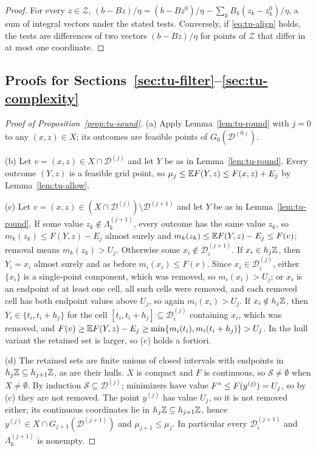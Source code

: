 \begin{proof}
For every $z\in\mathcal Z$,
$(b-Bz)/\eta=(b-Bz^0)/\eta-\sum_kB_k(z_k-z^0_k)/\eta$, a sum of integral
vectors under the stated tests. Conversely, if \eqref{eq:tu-align} holds, the
tests are differences of two vectors $(b-Bz)/\eta$ for points of
$\mathcal Z$ that differ in at most one coordinate.
\end{proof}

\subsection{Proofs for Sections~\ref{sec:tu-filter}--\ref{sec:tu-complexity}}\label{app:tu-proofs}

\begin{proof}[Proof of Proposition~\ref{prop:tu-sound}]
(a) Apply Lemma~\ref{lem:tu-round} with $j=0$ to any $(x,z)\in X$; its
outcomes are feasible points of $G_0(\mathcal D^{(0)})$.

(b) Let $v=(x,z)\in X\cap\mathcal D^{(j)}$ and let $Y$ be as in
Lemma~\ref{lem:tu-round}. Every outcome $(Y,z)$ is a feasible grid point, so
$\mu_j\le\mathbb E F(Y,z)\le F(x,z)+E_j$ by Lemma~\ref{lem:tu-allow}.

(c) Let $v=(x,z)\in(X\cap\mathcal D^{(j)})\setminus\mathcal D^{(j+1)}$ and
let $Y$ be as in Lemma~\ref{lem:tu-round}. If some value
$z_k\notin\Lambda^{(j+1)}_k$, every outcome has the same value $z_k$, so
$m_k(z_k)\le F(Y,z)-E_j$ almost surely and $m_k(z_k)\le\mathbb E F(Y,z)-E_j\le F(v)$;
removal means $m_k(z_k)>U_j$. Otherwise some
$x_i\notin\mathcal D^{(j+1)}_i$. If $x_i\in h_j\mathbb Z$, then $Y_i=x_i$ almost
surely and as before $m_i(x_i)\le F(v)$. Since $x_i\in\mathcal D^{(j)}_i$,
either $\{x_i\}$ is a single-point component, which was removed, so
$m_i(x_i)>U_j$; or $x_i$ is an endpoint of at least one cell, all such cells
were removed, and each removed cell has both endpoint values above $U_j$, so
again $m_i(x_i)>U_j$. If $x_i\notin h_j\mathbb Z$, then $Y_i\in\{t_i,t_i+h_j\}$ for
the cell $[t_i,t_i+h_j]\subseteq\mathcal D^{(j)}_i$ containing $x_i$, which was
removed, and $F(v)\ge\mathbb E F(Y,z)-E_j\ge\min\{m_i(t_i),m_i(t_i+h_j)\}>U_j$. In
the hull variant the retained set is larger, so (c) holds a fortiori.

(d) The retained sets are finite unions of closed intervals with endpoints in
$h_j\mathbb Z\subseteq h_{j+1}\mathbb Z$, as are their hulls. $X$ is compact and $F$ is
continuous, so $\mathcal S\ne\emptyset$ when $X\ne\emptyset$. By induction
$\mathcal S\subseteq\mathcal D^{(j)}$; minimizers have value
$F^{*}\le F(y^{(j)})=U_j$, so by (c) they are not removed. The point $y^{(j)}$
has value $U_j$, so it is not removed either; its continuous coordinates lie
in $h_j\mathbb Z\subseteq h_{j+1}\mathbb Z$, hence $y^{(j)}\in X\cap G_{j+1}(\mathcal D^{(j+1)})$
and $\mu_{j+1}\le\mu_j$. In particular every $\mathcal D^{(j+1)}_i$ and
$\Lambda^{(j+1)}_k$ is nonempty.


\end{proof}
